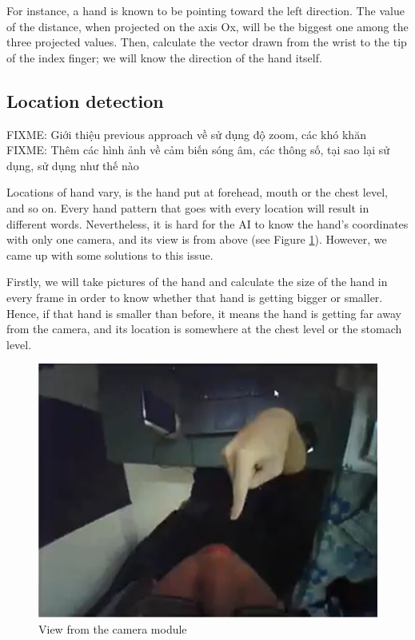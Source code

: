For instance, a hand is known to be pointing toward the left direction. The value of the distance, when projected on the axis Ox, will be the biggest one among the three projected values. Then, calculate the vector drawn from the wrist to the tip of the index finger; we will know the direction of the hand itself.

\subsection{Location detection}
FIXME: Giới thiệu previous approach về sử dụng độ zoom, các khó khăn
FIXME: Thêm các hình ảnh về cảm biến sóng âm, các thông số, tại sao lại sử dụng, sử dụng như thế nào

Locations of hand vary, is the hand put at forehead, mouth or the chest level, and so on. Every hand pattern that goes with every location will result in different words. Nevertheless, it is hard for the AI to know the hand's coordinates with only one camera, and its view is from above (see Figure \ref{fig:Chap4-ViewFromCamera}). However, we came up with some solutions to this issue.

Firstly, we will take pictures of the hand and calculate the size of the hand in every frame in order to know whether that hand is getting bigger or smaller. Hence, if that hand is smaller than before, it means the hand is getting far away from the camera, and its location is somewhere at the chest level or the stomach level.

\begin{figure}[H]
  \centering
  \includegraphics[width=\textwidth]{img/Chap4/ViewFromCamera.png}
  \caption{View from the camera module}
  \label{fig:Chap4-ViewFromCamera}
\end{figure}

